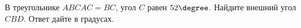 \begin{ex}
	\begin{condition}
		В треугольнике \(ABC AC=BC\), угол \( C \) равен \( 52\degree \). Найдите внешний угол \( CBD \). Ответ дайте в градусах.
	\end{condition}
\end{ex}